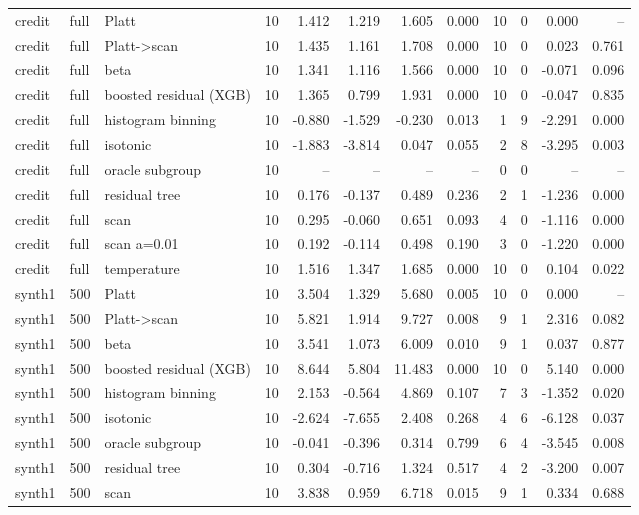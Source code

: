 \begin{tabular}{lllrrrrrrrrr}
credit & full & Platt & 10 & 1.412 & 1.219 & 1.605 & 0.000 & 10 & 0 & 0.000 & -- \\
credit & full & Platt->scan & 10 & 1.435 & 1.161 & 1.708 & 0.000 & 10 & 0 & 0.023 & 0.761 \\
credit & full & beta & 10 & 1.341 & 1.116 & 1.566 & 0.000 & 10 & 0 & -0.071 & 0.096 \\
credit & full & boosted residual (XGB) & 10 & 1.365 & 0.799 & 1.931 & 0.000 & 10 & 0 & -0.047 & 0.835 \\
credit & full & histogram binning & 10 & -0.880 & -1.529 & -0.230 & 0.013 & 1 & 9 & -2.291 & 0.000 \\
credit & full & isotonic & 10 & -1.883 & -3.814 & 0.047 & 0.055 & 2 & 8 & -3.295 & 0.003 \\
credit & full & oracle subgroup & 10 & -- & -- & -- & -- & 0 & 0 & -- & -- \\
credit & full & residual tree & 10 & 0.176 & -0.137 & 0.489 & 0.236 & 2 & 1 & -1.236 & 0.000 \\
credit & full & scan & 10 & 0.295 & -0.060 & 0.651 & 0.093 & 4 & 0 & -1.116 & 0.000 \\
credit & full & scan a=0.01 & 10 & 0.192 & -0.114 & 0.498 & 0.190 & 3 & 0 & -1.220 & 0.000 \\
credit & full & temperature & 10 & 1.516 & 1.347 & 1.685 & 0.000 & 10 & 0 & 0.104 & 0.022 \\
synth1 & 500 & Platt & 10 & 3.504 & 1.329 & 5.680 & 0.005 & 10 & 0 & 0.000 & -- \\
synth1 & 500 & Platt->scan & 10 & 5.821 & 1.914 & 9.727 & 0.008 & 9 & 1 & 2.316 & 0.082 \\
synth1 & 500 & beta & 10 & 3.541 & 1.073 & 6.009 & 0.010 & 9 & 1 & 0.037 & 0.877 \\
synth1 & 500 & boosted residual (XGB) & 10 & 8.644 & 5.804 & 11.483 & 0.000 & 10 & 0 & 5.140 & 0.000 \\
synth1 & 500 & histogram binning & 10 & 2.153 & -0.564 & 4.869 & 0.107 & 7 & 3 & -1.352 & 0.020 \\
synth1 & 500 & isotonic & 10 & -2.624 & -7.655 & 2.408 & 0.268 & 4 & 6 & -6.128 & 0.037 \\
synth1 & 500 & oracle subgroup & 10 & -0.041 & -0.396 & 0.314 & 0.799 & 6 & 4 & -3.545 & 0.008 \\
synth1 & 500 & residual tree & 10 & 0.304 & -0.716 & 1.324 & 0.517 & 4 & 2 & -3.200 & 0.007 \\
synth1 & 500 & scan & 10 & 3.838 & 0.959 & 6.718 & 0.015 & 9 & 1 & 0.334 & 0.688 \\

\end{tabular}
